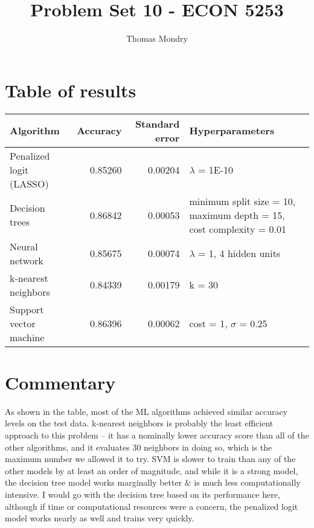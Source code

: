 \documentclass{article}
\title{Problem Set 10 - ECON 5253}
\author{Thomas Mondry}
\begin{document}
\maketitle

\section{Table of results}

\begin{table}[H]
	\centering
\begin{tabular}{l|r|r|l}
	\hline
	Algorithm & Accuracy & Standard error & Hyperparameters\\
	\hline
	Penalized logit (LASSO) & 0.85260 & 0.00204 & $\lambda$ = 1E-10\\
	\hline
	Decision trees & 0.86842 & 0.00053 & minimum split size = 10, maximum depth = 15, cost complexity = 0.01 \\
	\hline
	Neural network & 0.85675 & 0.00074 & $\lambda$ = 1, 4 hidden units\\
	\hline
	k-nearest neighbors & 0.84339 & 0.00179 & k = 30\\
	\hline
	Support vector machine & 0.86396 & 0.00062 & cost = 1, $\sigma$ = 0.25\\
	\hline
\end{tabular}
\end{table}

\section{Commentary}

As shown in the table, most of the ML algorithms achieved similar accuracy levels on the test data. k-nearest neighbors is probably the least efficient approach to this problem -- it has a nominally lower accuracy score than all of the other algorithms, and it evaluates 30 neighbors in doing so, which is the maximum number we allowed it to try. SVM is slower to train than any of the other models by at least an order of magnitude, and while it is a strong model, the decision tree model works marginally better \& is much less computationally intensive. I would go with the decision tree based on its performance here, although if time or computational resources were a concern, the penalized logit model works nearly as well and trains very quickly.
\end{document}
